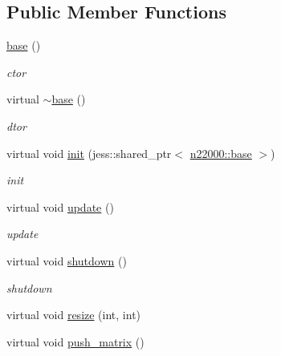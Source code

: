 \subsection*{Public Member Functions}
\begin{DoxyCompactItemize}
\item 
\hyperlink{classnebula_1_1platform_1_1renderer_1_1base_a6454716289a3b7bfcf782bfb03dc7ab1}{base} ()
\begin{DoxyCompactList}\small\item\em ctor \item\end{DoxyCompactList}\item 
virtual \hyperlink{classnebula_1_1platform_1_1renderer_1_1base_ad0b0261269c200f2ae1b705f991b56d0}{$\sim$base} ()
\begin{DoxyCompactList}\small\item\em dtor \item\end{DoxyCompactList}\item 
virtual void \hyperlink{classnebula_1_1platform_1_1renderer_1_1base_aa7d53dc81000acba49cc90519674f909}{init} (jess::shared\_\-ptr$<$ \hyperlink{classnebula_1_1platform_1_1window_1_1base}{n22000::base} $>$)
\begin{DoxyCompactList}\small\item\em init \item\end{DoxyCompactList}\item 
virtual void \hyperlink{classnebula_1_1platform_1_1renderer_1_1base_aa8290b3d6ac2b1908d44489002876723}{update} ()
\begin{DoxyCompactList}\small\item\em update \item\end{DoxyCompactList}\item 
virtual void \hyperlink{classnebula_1_1platform_1_1renderer_1_1base_a679ac8cd3db96e1bce5f2b5ef00f91e1}{shutdown} ()
\begin{DoxyCompactList}\small\item\em shutdown \item\end{DoxyCompactList}\item 
virtual void \hyperlink{classnebula_1_1platform_1_1renderer_1_1base_ad41ade8ed9ea4995654e06287373646c}{resize} (int, int)
\item 
virtual void \hyperlink{classnebula_1_1platform_1_1renderer_1_1base_a6e3c0756670cb17a277b7e0ab0bab5a1}{push\_\-matrix} ()

\end{DoxyCompactItemize}
